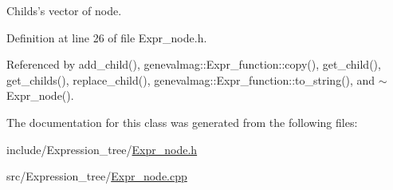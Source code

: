 Childs's vector of node. 



Definition at line 26 of file Expr\_\-node.h.



Referenced by add\_\-child(), genevalmag::Expr\_\-function::copy(), get\_\-child(), get\_\-childs(), replace\_\-child(), genevalmag::Expr\_\-function::to\_\-string(), and $\sim$Expr\_\-node().



The documentation for this class was generated from the following files:\begin{DoxyCompactItemize}
\item 
include/Expression\_\-tree/\hyperlink{Expr__node_8h}{Expr\_\-node.h}\item 
src/Expression\_\-tree/\hyperlink{Expr__node_8cpp}{Expr\_\-node.cpp}\end{DoxyCompactItemize}
